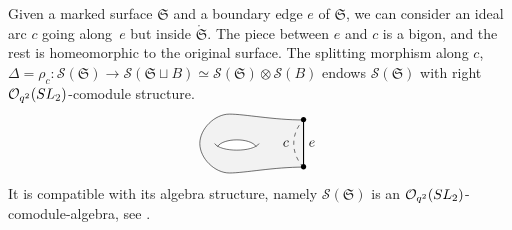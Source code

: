 \documentclass[11pt]{article}
\numberwithin{equation}{section}
\numberwithin{equation}{section}
\newcommand{\Oq}{\mathcal{O}_{q^2}({\rm SL}_2)}
\begin{document}
Given a marked surface $\mathfrak{S}$ and a boundary edge $e$ of $\mathfrak{S}$, we can consider an ideal arc $c$ going along~$e$ but inside $\mathring{\mathfrak{S}}$. The piece between $e$ and $c$ is a bigon, and the rest is homeomorphic to the original surface. The splitting morphism along $c$, $\Delta = \rho_c\colon \mathscr{S}(\mathfrak{S}) \to \mathscr{S}(\mathfrak{S}\sqcup B)\simeq \mathscr{S}(\mathfrak{S})\otimes \mathscr{S}(B)$ endows $\mathscr{S}(\mathfrak{S})$ with right $\Oq$-comodule structure.
$$
\begin{tikzpicture}[xscale = 0.75, yscale = 0.75,baseline = 10pt]
\fill[gray!10] (3.5,0.2) coordinate (B)	.. controls (2.5,0.2) and (1.5,0 ) .. (1,0)	.. controls (0.5,0 ) and (0,0.5 ) .. (0,1)	.. controls (0,1.5 ) and (0.5,2 ) .. (1,2)	.. controls (1.5,2 ) and (2.5,1.8) .. (3.5,1.8) coordinate (H) -- cycle ;
\fill[white] (0.6,0.9) .. controls (0.7,0.7) and (1.8,0.7) .. (1.9,0.9) .. controls (1.7,1.2) and (0.8,1.2) .. (0.6,0.9);
\draw (0.5,1) .. controls (0.7,0.7) and (1.8,0.7) .. (2,1);
\draw (0.6,0.9) .. controls (0.8,1.2) and (1.7,1.2) .. (1.9,0.9);
\draw (3.5,0.2) node{\small $\bullet$}	.. controls (2.5,0.2) and (1.5,0 ) .. (1,0)	.. controls (0.5,0 ) and (0,0.5 ) .. (0,1)	.. controls (0,1.5 ) and (0.5,2 ) .. (1,2)	.. controls (1.5,2 ) and (2.5,1.8) .. (3.5,1.8) node{\small $\bullet$};
\draw[thick] (B) -- (H) node[midway,right]{$e$};
\path[dashed, bend left = 150pt, in = 135, out = 45] (B) edge node[midway,left]{$c$} (H);
\end{tikzpicture}
$$
It is compatible with its algebra structure, namely $\mathscr{S}(\mathfrak{S})$ is an $\Oq$-comodule-algebra, see \cite[Proposition~4.1]{Cos}.
\end{document}

